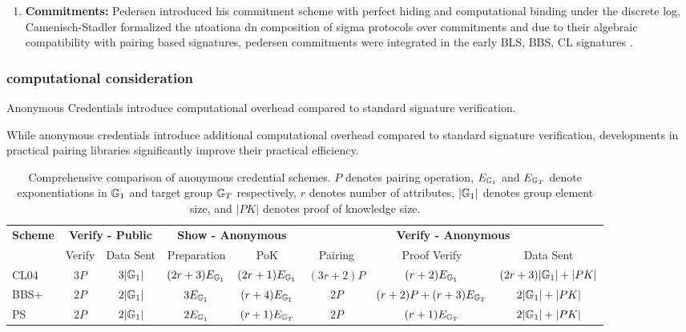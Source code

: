 {\begin{enumerate}
    \item \textbf{Commitments: } \cite{pedersen1991non} Pedersen introduced his commitment scheme with perfect hiding and computational binding under the discrete log, \cite{goos_efficient_1997} Camenisch-Stadler formalized the ntoationa dn composition of sigma protocols over commitments and due to their algebraic compatibility with pairing based signatures, pedersen commitments were integrated in the early BLS, BBS, CL signatures \cite{goos_short_2001, hutchison_short_2004, hutchison_signature_2004}. 
    
\end{enumerate}

\subsubsection{computational consideration}
Anonymous Credentials introduce computational overhead compared to standard signature verification. 


While anonymous credentials introduce additional computational overhead compared to standard signature verification, developments in practical pairing libraries significantly improve their practical efficiency. 






\begin{table}[ht]
\centering
\begin{tabular}{l|cc|cc|ccc}
\toprule
\multirow{2}{*}{\textbf{Scheme}} & \multicolumn{2}{c|}{\textbf{Verify - Public}} & \multicolumn{2}{c|}{\textbf{Show - Anonymous}} & \multicolumn{3}{c}{\textbf{Verify - Anonymous}} \\
& Verify & Data Sent & Preparation & PoK & Pairing & Proof Verify & Data Sent \\
\midrule
CL04 & $3P$ & $3|\mathbb{G}_1|$ & $(2r + 3)E_{\mathbb{G}_1}$ & $(2r + 1)E_{\mathbb{G}_1}$ & $(3r + 2)P$ & $(r + 2)E_{\mathbb{G}_1}$ & $(2r + 3)|\mathbb{G}_1| + |PK|$ \\
BBS+ & $2P$ & $2|\mathbb{G}_1|$ & $3E_{\mathbb{G}_1}$ & $(r + 4)E_{\mathbb{G}_1}$ & $2P$ & $(r + 2)P + (r + 3)E_{\mathbb{G}_T}$ & $2|\mathbb{G}_1| + |PK|$ \\
PS & $2P$ & $2|\mathbb{G}_1|$ & $2E_{\mathbb{G}_1}$ & $(r + 1)E_{\mathbb{G}_T}$ & $2P$ & $(r + 1)E_{\mathbb{G}_T}$ & $2|\mathbb{G}_1| + |PK|$ \\
\bottomrule
\end{tabular}
\caption{Comprehensive comparison of anonymous credential schemes. $P$ denotes pairing operation, $E_{\mathbb{G}_1}$ and $E_{\mathbb{G}_T}$ denote exponentiations in $\mathbb{G}_1$ and target group $\mathbb{G}_T$ respectively, $r$ denotes number of attributes, $|\mathbb{G}_1|$ denotes group element size, and $|PK|$ denotes proof of knowledge size.}
\label{tab:unified-comparison}
\end{table}






}

